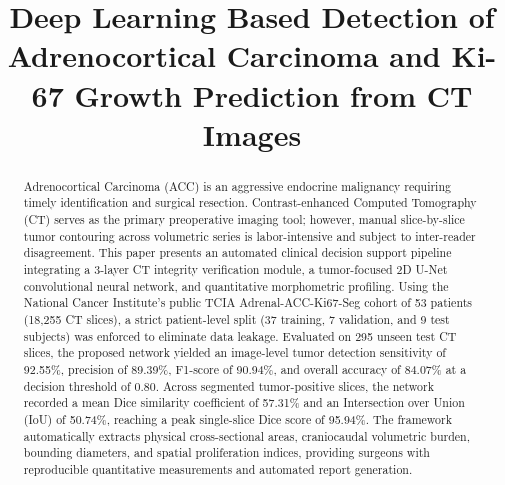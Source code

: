 \documentclass[conference]{IEEEtran}
\begin{document}
\title{Deep Learning Based Detection of Adrenocortical Carcinoma and Ki-67 Growth Prediction from CT Images}

\author{
}

\maketitle

\begin{abstract}
Adrenocortical Carcinoma (ACC) is an aggressive endocrine malignancy requiring timely identification and surgical resection. Contrast-enhanced Computed Tomography (CT) serves as the primary preoperative imaging tool; however, manual slice-by-slice tumor contouring across volumetric series is labor-intensive and subject to inter-reader disagreement. This paper presents an automated clinical decision support pipeline integrating a 3-layer CT integrity verification module, a tumor-focused 2D U-Net convolutional neural network, and quantitative morphometric profiling. Using the National Cancer Institute's public TCIA Adrenal-ACC-Ki67-Seg cohort of 53 patients (18,255 CT slices), a strict patient-level split (37 training, 7 validation, and 9 test subjects) was enforced to eliminate data leakage. Evaluated on 295 unseen test CT slices, the proposed network yielded an image-level tumor detection sensitivity of 92.55\%, precision of 89.39\%, F1-score of 90.94\%, and overall accuracy of 84.07\% at a decision threshold of 0.80. Across segmented tumor-positive slices, the network recorded a mean Dice similarity coefficient of 57.31\% and an Intersection over Union (IoU) of 50.74\%, reaching a peak single-slice Dice score of 95.94\%. The framework automatically extracts physical cross-sectional areas, craniocaudal volumetric burden, bounding diameters, and spatial proliferation indices, providing surgeons with reproducible quantitative measurements and automated report generation.
\end{abstract}
\end{document}
